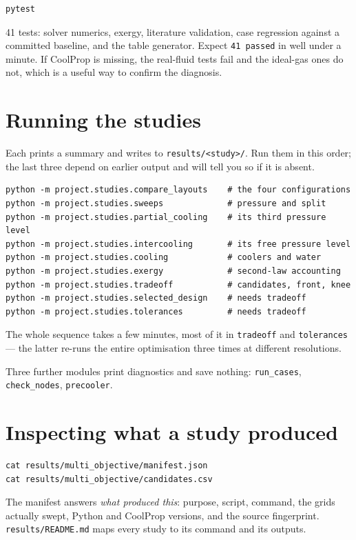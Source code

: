 \documentclass[11pt,a4paper]{report}
\newcommand{\code}[1]{\texttt{\small #1}}
\begin{document}
\begin{verbatim}
pytest
\end{verbatim}

41 tests: solver numerics, exergy, literature validation, case
regression against a committed baseline, and the table generator.
Expect \code{41 passed} in well under a minute. If CoolProp is missing,
the real-fluid tests fail and the ideal-gas ones do not, which is a
useful way to confirm the diagnosis.

\section{Running the studies}

Each prints a summary and writes to \code{results/<study>/}. Run them
in this order; the last three depend on earlier output and will tell you
so if it is absent.

\begin{verbatim}
python -m project.studies.compare_layouts    # the four configurations
python -m project.studies.sweeps             # pressure and split
python -m project.studies.partial_cooling    # its third pressure level
python -m project.studies.intercooling       # its free pressure level
python -m project.studies.cooling            # coolers and water
python -m project.studies.exergy             # second-law accounting
python -m project.studies.tradeoff           # candidates, front, knee
python -m project.studies.selected_design    # needs tradeoff
python -m project.studies.tolerances         # needs tradeoff
\end{verbatim}

The whole sequence takes a few minutes, most of it in \code{tradeoff}
and \code{tolerances} --- the latter re-runs the entire optimisation
three times at different resolutions.

Three further modules print diagnostics and save nothing:
\code{run\_cases}, \code{check\_nodes}, \code{precooler}.

\section{Inspecting what a study produced}

\begin{verbatim}
cat results/multi_objective/manifest.json
cat results/multi_objective/candidates.csv
\end{verbatim}

The manifest answers \emph{what produced this}: purpose, script,
command, the grids actually swept, Python and CoolProp versions, and the
source fingerprint. \code{results/README.md} maps every study to its
command and its outputs.
\end{document}
